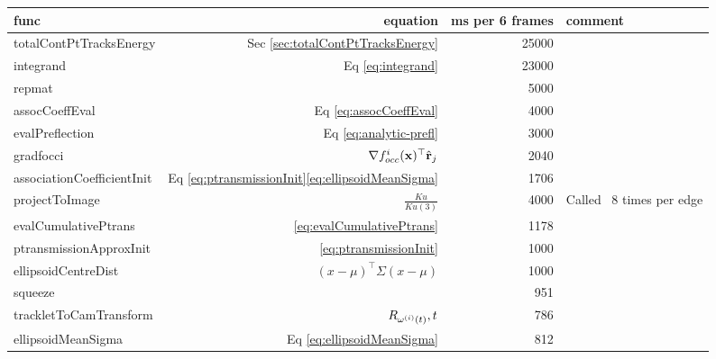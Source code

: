 \documentclass[10pt,twocolumn,letterpaper]{article}
\begin{document}
\begin{table}
  \begin{tabular}{|l|r|r|l|}
    \hline
    func            & equation                      & ms per 6 frames &
    comment \\
    \hline
    totalContPtTracksEnergy & Sec \ref{sec:totalContPtTracksEnergy} & 25000 &
    \\
    integrand & Eq \eqref{eq:integrand} & 23000 & \\
    repmat & & 5000 & \\
    assocCoeffEval & Eq \eqref{eq:assocCoeffEval} & 4000 & \\
    evalPreflection & Eq \eqref{eq:analytic-prefl} & 3000 & \\
    gradfocci & $\nabla f^i_{occ}(\mathbf{x})^\top \hat{\mathbf{r}}_j$ & 2040 & \\
    associationCoefficientInit & Eq
    \eqref{eq:ptransmissionInit}\eqref{eq:ellipsoidMeanSigma} & 1706 & \\
    projectToImage & $\frac{Ku}{Ku(3)}$ & 4000 & Called ~8 times per edge\\
    evalCumulativePtrans & \eqref{eq:evalCumulativePtrans} & 1178 & \\
    ptransmissionApproxInit & \eqref{eq:ptransmissionInit} & 1000 & \\
    ellipsoidCentreDist & $(x-\mu)^\top \Sigma (x-\mu)$ & 1000 & \\
    squeeze & & 951 &\\
    trackletToCamTransform & $R_{\mathbf{\omega}^{(i)}(t)}, t$ & 786 & \\
    ellipsoidMeanSigma & Eq \eqref{eq:ellipsoidMeanSigma} & 812 & \\
    \hline
  \end{tabular}
\end{table}

{\small


}
\end{document}
